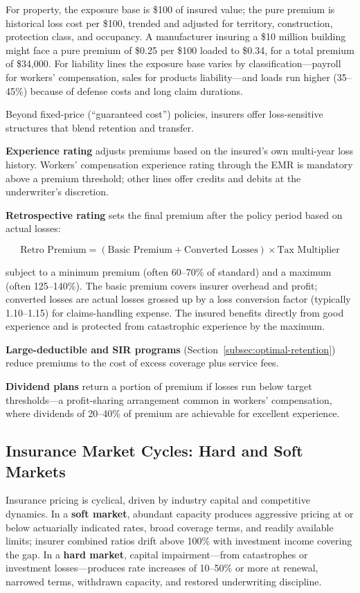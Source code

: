 \documentclass[11pt,openany]{book}
\begin{document}
For property, the exposure base is \$100 of insured value; the pure premium
is historical loss cost per \$100, trended and adjusted for territory,
construction, protection class, and occupancy. A manufacturer insuring a \$10
million building might face a pure premium of \$0.25 per \$100 loaded to
\$0.34, for a total premium of \$34,000. For liability lines the exposure
base varies by classification---payroll for workers' compensation, sales for
products liability---and loads run higher (35--45\%) because of defense costs
and long claim durations.

Beyond fixed-price (``guaranteed cost'') policies, insurers offer
loss-sensitive structures that blend retention and transfer.

\textbf{Experience rating} adjusts premiums based on the insured's own
multi-year loss history. Workers' compensation experience rating through the
EMR is mandatory above a premium threshold; other lines offer credits and
debits at the underwriter's discretion.

\textbf{Retrospective rating} sets the final premium after the policy period
based on actual losses:

\[
\text{Retro Premium} = (\text{Basic Premium} + \text{Converted Losses})
\times \text{Tax Multiplier}
\]

subject to a minimum premium (often 60--70\% of standard) and a maximum
(often 125--140\%). The basic premium covers insurer overhead and profit;
converted losses are actual losses grossed up by a loss conversion factor
(typically 1.10--1.15) for claims-handling expense. The insured benefits
directly from good experience and is protected from catastrophic experience
by the maximum.

\textbf{Large-deductible and SIR programs}
(Section~\ref{subsec:optimal-retention}) reduce premiums to the cost of
excess coverage plus service fees.

\textbf{Dividend plans} return a portion of premium if losses run below
target thresholds---a profit-sharing arrangement common in workers'
compensation, where dividends of 20--40\% of premium are achievable for
excellent experience.

\subsection{Insurance Market Cycles: Hard and Soft Markets}
\label{subsec:market-cycles}

Insurance pricing is cyclical, driven by industry capital and competitive
dynamics. In a \textbf{soft market}, abundant capacity produces aggressive
pricing at or below actuarially indicated rates, broad coverage terms, and
readily available limits; insurer combined ratios drift above 100\% with
investment income covering the gap. In a \textbf{hard market}, capital
impairment---from catastrophes or investment losses---produces rate increases
of 10--50\% or more at renewal, narrowed terms, withdrawn capacity, and
restored underwriting discipline.
\end{document}
